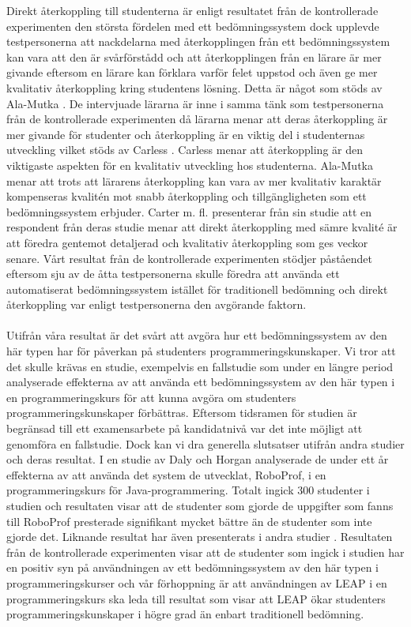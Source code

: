 \documentclass[a4paper,11pt]{article}
\begin{document}
{Direkt återkoppling till studenterna är enligt resultatet från de kontrollerade experimenten den största fördelen med ett bedömningssystem dock upplevde testpersonerna att nackdelarna med återkopplingen från ett bedömningssystem kan vara att den är svårförstådd och att återkopplingen från en lärare är mer givande eftersom en lärare kan förklara varför felet uppstod och även ge mer kvalitativ återkoppling kring studentens lösning. Detta är något som stöds av Ala-Mutka \cite{ala-mutka}. De intervjuade lärarna är inne i samma tänk som testpersonerna från de kontrollerade experimenten då lärarna menar att deras återkoppling är mer givande för studenter och återkoppling är en viktig del i studenternas utveckling vilket stöds av Carless \cite{carless}. Carless menar att återkoppling är den viktigaste aspekten för en kvalitativ utveckling hos studenterna. Ala-Mutka \cite{ala-mutka} menar att trots att lärarens återkoppling kan vara av mer kvalitativ karaktär kompenseras kvalitén mot snabb återkoppling och tillgängligheten som ett bedömningssystem erbjuder. Carter m. fl. \cite{carter} presenterar från sin studie att en respondent från deras studie menar att direkt återkoppling med sämre kvalité är att föredra gentemot detaljerad och kvalitativ återkoppling som ges veckor senare. Vårt resultat från de kontrollerade experimenten stödjer påståendet eftersom sju av de åtta testpersonerna skulle föredra att använda ett automatiserat bedömningssystem istället för traditionell bedömning och direkt återkoppling var enligt testpersonerna den avgörande faktorn.
\\
\\
Utifrån våra resultat är det svårt att avgöra hur ett bedömningssystem av den här typen har för påverkan på studenters programmeringskunskaper. Vi tror att det skulle krävas en studie, exempelvis en fallstudie som under en längre period analyserade effekterna av att använda ett bedömningssystem av den här typen i en programmeringskurs för att kunna avgöra om studenters programmeringskunskaper förbättras. Eftersom tidsramen för studien är begränsad till ett examensarbete på kandidatnivå var det inte möjligt att genomföra en fallstudie. Dock kan vi dra generella slutsatser utifrån andra studier och deras resultat. I en studie av Daly och Horgan \cite{roboprof_4} analyserade de under ett år effekterna av att använda det system de utvecklat, RoboProf, i en programmeringskurs för Java-programmering. Totalt ingick 300 studenter i studien och resultaten visar att de studenter som gjorde de uppgifter som fanns till RoboProf presterade signifikant mycket bättre än de studenter som inte gjorde det. Liknande resultat har även presenterats i andra studier \cite{higgins_coursemarker_12} \cite{japanerna_1}. Resultaten från de kontrollerade experimenten visar att de studenter som ingick i studien har en positiv syn på användningen av ett bedömningssystem av den här typen i programmeringskurser och vår förhoppning är att användningen av LEAP i en programmeringskurs ska leda till resultat som visar att LEAP ökar studenters programmeringskunskaper i högre grad än enbart traditionell bedömning. 
}
\end{document}
